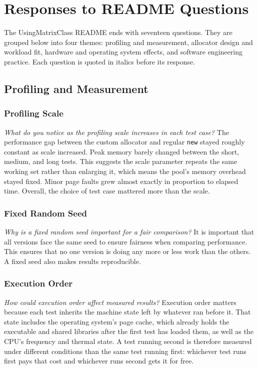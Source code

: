 \section{Responses to README Questions}
\label{sec:readme-questions}

The UsingMatrixClass README ends with seventeen questions.
They are grouped below into four themes: profiling and measurement, allocator
design and workload fit, hardware and operating system effects, and software
engineering practice.
Each question is quoted in italics before its response.

\subsection{Profiling and Measurement}
\label{sec:rq-measurement}

\subsubsection{Profiling Scale}
\emph{What do you notice as the profiling scale increases in each test case?}
The performance gap between the custom allocator and regular \texttt{new}
stayed roughly constant as scale increased.
Peak memory barely changed between the short, medium, and long tests.
This suggests the scale parameter repeats the same working set rather than
enlarging it, which means the pool's memory overhead stayed fixed.
Minor page faults grew almost exactly in proportion to elapsed time.
Overall, the choice of test case mattered more than the scale.

\subsubsection{Fixed Random Seed}
\emph{Why is a fixed random seed important for a fair comparison?}
It is important that all versions face the same seed to ensure fairness when
comparing performance.
This ensures that no one version is doing any more or less work than the
others.
A fixed seed also makes results reproducible.

\subsubsection{Execution Order}
\emph{How could execution order affect measured results?}
Execution order matters because each test inherits the machine state left by
whatever ran before it.
That state includes the operating system's page cache, which already holds the
executable and shared libraries after the first test has loaded them, as well
as the CPU's frequency and thermal state.
A test running second is therefore measured under different conditions than
the same test running first: whichever test runs first pays that cost and
whichever runs second gets it for free.

